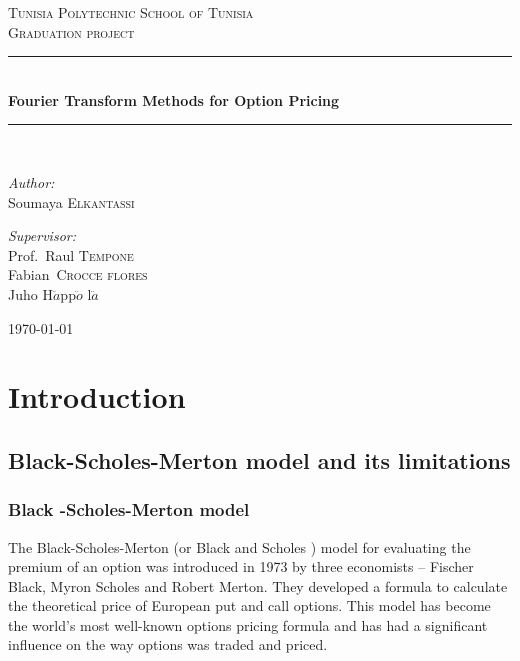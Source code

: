 \documentclass[12pt]{report}
\newcommand{\HRule}{\rule{\linewidth}{0.5mm}}
\begin{document}
\begin{titlepage}
\begin{center}
\textsc{\Large Tunisia Polytechnic School of Tunisia}\\[1.5cm]
\textsc{\Large Graduation project}\\[0.5cm]
\HRule \\[0.4cm]
{ \huge \bfseries Fourier Transform Methods for Option Pricing \\[0.4cm] }

\HRule \\[1.5cm]

\noindent
\begin{minipage}[t]{0.4\textwidth}
\begin{flushleft} \large
\emph{Author:}\\
Soumaya \textsc{Elkantassi}
\end{flushleft}
\end{minipage}%
\begin{minipage}[t]{0.6\textwidth}
\begin{flushright} \large
\emph{Supervisor:} \\
Prof.~Raul \textsc{Tempone}\\
Fabian\textsc{~Crocce flores}\\
Juho H$\ddot{a}$pp$\ddot{o}$
l$\ddot{a}
$
\end{flushright}
\end{minipage}
\vfill
{\large \today}
\end{center}
\end{titlepage}



\part{Introduction}
\chapter{Black-Scholes-Merton model and its limitations}
\section{Black -Scholes-Merton model}
The Black-Scholes-Merton (or Black and Scholes ) model for evaluating the premium of an option was introduced in 1973 by three economists – Fischer Black, Myron Scholes and Robert Merton.  They developed a formula to calculate the theoretical  price of European put and call options. This model has become the world's most well-known options pricing formula and has had a significant influence on the way options was traded and priced.\\
\end{document}
